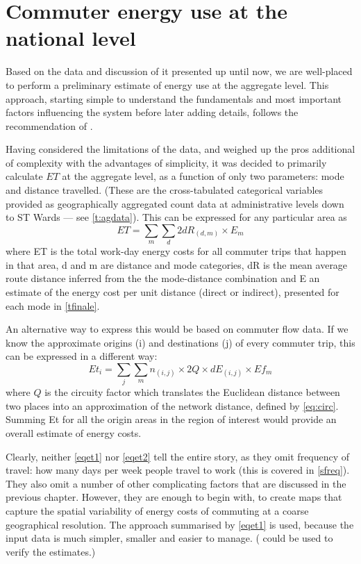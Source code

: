 \section{Commuter energy use at the national level} \label{snational}
Based on the data and discussion of it presented up until now, we are
well-placed to perform a preliminary estimate of energy use at the aggregate level.
This approach, starting simple to understand the fundamentals and most important
factors influencing the system before later adding details, follows the
recommendation of \citet{batty1976urban}.

Having considered the limitations of the data, and weighed up the
pros additional of complexity with the advantages of simplicity, it was decided to
primarily calculate $ET$ at the aggregate level,
as a function of only two parameters: mode and distance travelled.
(These are the cross-tabulated categorical variables provided as geographically
aggregated count data at administrative levels down to ST Wards ---
see \cref{t:agdata}). This can be expressed for any particular area as
\begin{equation}
 ET = \sum_m \sum_d{2dR_{(d,m)} \times E_m}
 \label{eqet1}
\end{equation}
where ET is the total work-day energy costs for all commuter trips that happen
in that area, d and m are distance and mode categories, dR is the mean average
route distance inferred from the the mode-distance combination and E an
estimate of the
energy cost per unit distance (direct or indirect), presented for each mode
in \cref{tfinale}.

An alternative way to express this would be based on commuter flow data.
If we know the approximate origins (i) and destinations (j) of every commuter
trip, this can be expressed in a different way:
\begin{equation}
 Et_i = \sum_j \sum_m {n_{(i,j)} \times 2Q \times dE_{(i,j)} \times Ef_m}
 \label{eqet2}
\end{equation}
where $Q$ is the circuity factor which translates the Euclidean distance between
two places into an approximation of the network distance, defined by \cref{eq:circ}.
Summing Et for all the origin areas in the region of interest would provide
an overall estimate of energy costs.

Clearly, neither \cref{eqet1} nor \cref{eqet2}
tell the entire story, as they omit frequency of travel: how many days
per week people travel to work (this is covered in \cref{sfreq}).
They also omit a number of other complicating factors that are discussed in
the previous chapter.  However, they are enough to begin with, to create maps
that capture the spatial variability of energy costs of commuting at
a coarse geographical resolution.
The approach summarised by \cref{eqet1} is used, because the input data
is much simpler, smaller and easier to manage. ( could be used
to verify the estimates.)

